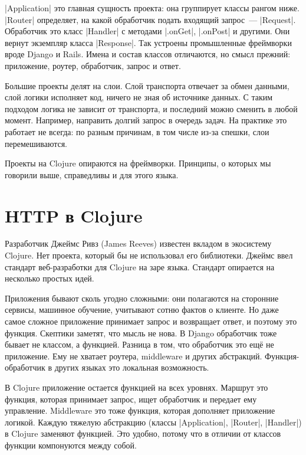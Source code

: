 \spverb|Application| это главная сущность проекта: она группирует классы рангом
ниже. \spverb|Router| определяет, на какой обработчик подать входящий запрос~---
\spverb|Request|. Обработчик это класс \spverb|Handler| с методами
\spverb|.onGet|, \spverb|.onPost| и другими. Они вернут экземпляр класса
\spverb|Response|. Так устроены промышленные фреймворки вроде Django и
Rails. Имена и состав классов отличаются, но смысл прежний: приложение, роутер,
обработчик, запрос и ответ.


Большие проекты делят на слои. Слой транспорта отвечает за обмен данными, слой
логики исполняет код, ничего не зная об источнике данных. С таким подходом
логика не зависит от транспорта, и последний можно сменить в любой
момент. Например, направить долгий запрос в очередь задач. На практике это
работает не всегда: по разным причинам, в том числе из-за спешки, слои
перемешиваются.

Проекты на Clojure опираются на фреймворки. Принципы, о которых мы говорили
выше, справедливы и для этого языка.

\section{HTTP в Clojure}


Разработчик Джеймс Ривз (James Reeves)
известен вкладом в экосистему Clojure. Нет проекта, который бы не использовал
его библиотеки. Джеймс ввел стандарт веб-разработки для Clojure на заре
языка. Стандарт опирается на несколько простых идей.

Приложения бывают сколь угодно сложными: они полагаются на сторонние сервисы,
машинное обучение, учитывают сотню фактов о клиенте. Но даже самое сложное
приложение принимает запрос и возвращает ответ, и поэтому это функция. Скептики
заметят, что мысль не нова. В Django обработчик тоже бывает не классом, а
функцией. Разница в том, что обработчик это ещ\"{е} не приложение. Ему не
хватает роутера, middleware и других абстракций. Функция-обработчик в других
языках это локальная возможность.

\label{http-all-function}

В Clojure приложение остается функцией на всех уровнях. Маршрут это функция,
которая принимает запрос, ищет обработчик и передает ему управление. Middleware
это тоже функция, которая дополняет приложение логикой. Каждую тяжелую
абстракцию (классы \spverb|Application|, \spverb|Router|, \spverb|Handler|) в
Clojure заменяют функцией. Это удобно, потому что в отличии от классов функции
компонуются между собой.

